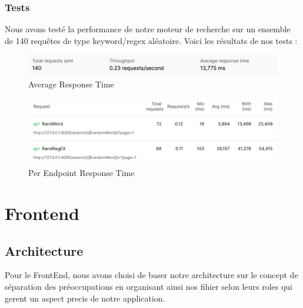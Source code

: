 \subsubsection{Tests}\label{tests}

Nous avons testé la performance de notre moteur de recherche sur un
ensemble de 140 requêtes de type keyword/regex aléatoire. Voici les
résultats de nos tests :

\begin{figure}
\centering
\includegraphics{./avgTotal.png}
\caption{Average Response Time}
\end{figure}

\begin{figure}
\centering
\includegraphics{./avgPerEndPoint.png}
\caption{Per Endpoint Response Time}
\end{figure}

\section{Frontend}\label{frontend-2}

\subsection{Architecture}\label{architecture-1}

Pour le FrontEnd, nous avons choisi de baser notre architecture sur le
concept de séparation des préoccupations en organisant ainsi nos fihier
selon leurs roles qui gerent un aspect precis de notre application.

